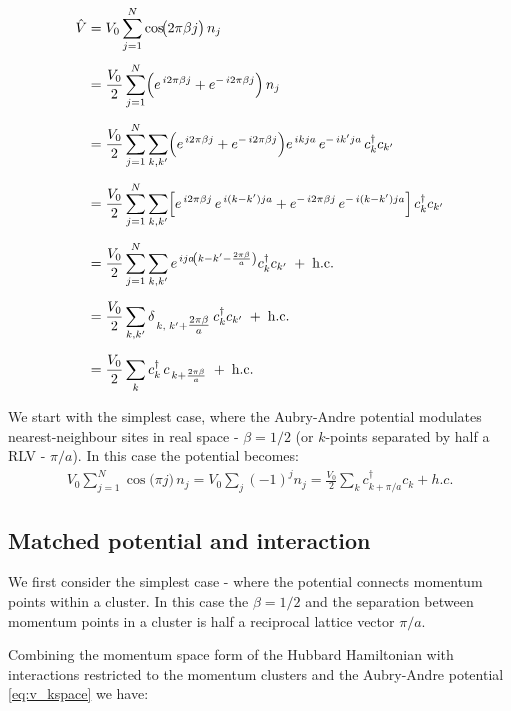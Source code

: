 \documentclass[12pt]{article}
\numberwithin{equation}{section}
\begin{document}
\begin{align}
\hat V
  &= V_0 \sum_{j=1}^{N} \cos\!\bigl(2\pi \beta j\bigr)\, n_j \\[4pt]
  &= \frac{V_0}{2}\sum_{j=1}^{N} 
     \Bigl(e^{\,i2\pi\beta j}+e^{-\,i2\pi\beta j}\Bigr)\, n_j \\[6pt]
  &= \frac{V_0}{2}\sum_{j=1}^{N}\sum_{k,k'}
     \Bigl(e^{\,i2\pi\beta j}+e^{-\,i2\pi\beta j}\Bigr)
     e^{\,i k j a}\,e^{-\,i k' j a}\,
     c^{\dagger}_{k} c_{k'} \\[6pt]
  &= \frac{V_0}{2}\sum_{j=1}^{N}\sum_{k,k'}
     \Bigl[e^{\,i2\pi\beta j}\,e^{\,i(k-k')j a}
           +e^{-\,i2\pi\beta j}\,e^{-\,i(k-k')j a}\Bigr]\,
     c^{\dagger}_{k} c_{k'} \\[6pt]
  &= \frac{V_0}{2}\sum_{j=1}^{N}\sum_{k,k'}
     e^{\,i j a\!\left(k-k'-\frac{2\pi\beta}{a}\right)}
     c^{\dagger}_{k} c_{k'} \;+\;\text{h.c.} \\[6pt]
  &= \frac{V_0}{2}\sum_{k,k'}
     \delta_{\,k,\;k'+\tfrac{2\pi\beta}{a}}\,
     c^{\dagger}_{k} c_{k'} \;+\;\text{h.c.} \\[6pt]
  &= \frac{V_0}{2}\sum_{k}
     c^{\dagger}_{k}\,c_{\,k+\frac{2\pi\beta}{a}} \;+\;\text{h.c.}
\end{align}


We start with the simplest case, where the Aubry-Andre potential modulates nearest-neighbour sites in real space - $\beta=1/2$ (or $k$-points separated by half a RLV - $\pi/a$). In this case the potential becomes:
\begin{align}
\label{eq:v_kspace}
V_0 \sum_{j=1}^{N} \cos\!\bigl(\pi j\bigr)\, n_{j}=
V_0\sum_{j}(-1)^jn_j=
\frac{V_0}{2}\sum_{k}c^\dagger_{k+\pi/a}c_{k}+h.c.
\end{align}

\subsection{Matched potential and interaction}
We first consider the simplest case - where the potential connects momentum points within a cluster. In this case the $\beta=1/2$ and the separation between momentum points in a cluster is half a reciprocal lattice vector $\pi/a$.

Combining the momentum space form of the Hubbard Hamiltonian with interactions restricted to the momentum clusters and the Aubry-Andre potential \cref{eq:v_kspace} we have:
\end{document}
